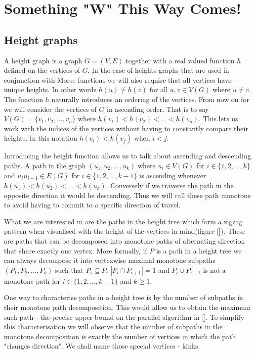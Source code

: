 \chapter{Something "W" This Way Comes!}
\label{chapter2}

\section{Height graphs}

A height graph is a graph $G = (V, E)$ together with a real valued function $h$ defined on the vertices of $G$. In the case of heights graphs that are used in conjunction with Morse functions we will also require that all vertices have unique heights. In other words $h(u) \ne h(v)$ for all $u ,v \in V(G)$ where $u \ne v$. The function $h$ naturally introduces an ordering of the vertices. From now on for we will consider the vertices of $G$ in ascending order. That is to say $V(G) = \{v_1, v_2, ... , v_n\}$ where $h(v_1) < h(v_2) < ... < h(v_n)$. This lets us work with the indices of the vertices without having to constantly compare their heights. In this notation $h(v_i) < h(v_j)$ when $i < j$.


Introducing the height function allows us to talk about ascending and descending paths. A path in the graph $(u_1, u_2, ... , u_k)$ where $u_i \in V(G)$ for $i \in \{1, 2, ..., k\}$ and $u_iu_{i+1} \in E(G)$ for $i \in \{1, 2, ..., k-1\}$ is ascending whenever $h(u_1) < h(u_2) < ... < h(u_k)$. Conversely if we traverse the path in the opposite direction it would be descending. Thus we will call these path monotone to avoid having to commit to a specific direction of travel.

What we are interested in are the paths in the height tree which form a zigzag pattern when visualised with the height of the vertices in mind(figure []). These are paths that can be decomposed into monotone paths of alternating direction that share exactly one vertex. More formally, if $P$ is a path in a height tree we can always decompose it into vertexwise maximal monotone subpaths $(P_1, P_2, ..., P_k)$ such that $P_i \subseteq P$, $|P_i \cap P_{i+1}| = 1$ and $P_i \cup P_{i+1}$ is not a monotone path for $i \in \{1, 2, ..., k-1\}$ and $k \ge 1$. 

One way to characterise paths in a height tree is by the number of subpaths in their monotone path decomposition. This would allow us to obtain the maximum such path - the precise upper bound on the parallel algorithm in []. To simplify this characterisation we will observe that the number of subpaths in the monotone decomposition is exactly the number of vertices in which the path "changes direction". We shall name those special vertices - kinks.

